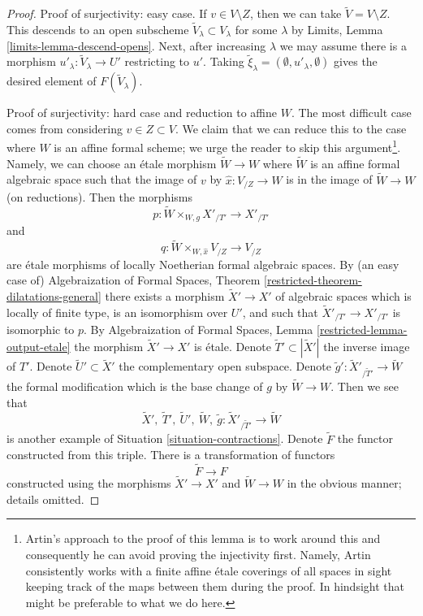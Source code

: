 \begin{proof}
\medskip\noindent
Proof of surjectivity: easy case.
If $v \in V \setminus Z$, then we can take $\tilde V = V \setminus Z$.
This descends to an open subscheme $\tilde V_\lambda \subset V_\lambda$
for some $\lambda$ by Limits, Lemma
\ref{limits-lemma-descend-opens}.
Next, after increasing $\lambda$ we may assume
there is a morphism $u'_\lambda : \tilde V_\lambda \to U'$
restricting to $u'$. Taking
$\tilde \xi_\lambda = (\emptyset, u'_\lambda, \emptyset)$
gives the desired element of $F(\tilde V_\lambda)$.

\medskip\noindent
Proof of surjectivity: hard case and reduction to affine $W$.
The most difficult case comes from considering $v \in Z \subset V$.
We claim that we can reduce this to the case where $W$ is an
affine formal scheme; we urge the reader to skip this argument\footnote{Artin's
approach to the proof of this lemma is to work around this and
consequently he can avoid proving the injectivity first. Namely, Artin
consistently works with a finite affine \'etale coverings of all spaces
in sight keeping track of the maps between them during the proof.
In hindsight that might be preferable to what we do here.}.
Namely, we can choose an \'etale morphism
$\tilde W \to W$ where $\tilde W$ is an affine formal algebraic space
such that the image of $v$ by $\hat x : V_{/Z} \to W$ is
in the image of $\tilde W \to W$ (on reductions).
Then the morphisms
$$
p : \tilde W \times_{W, g} X'_{/T'} \longrightarrow X'_{/T'}
$$
and
$$
q : \tilde W \times_{W, \hat x} V_{/Z} \to V_{/Z}
$$
are \'etale morphisms of locally Noetherian formal algebraic spaces.
By (an easy case of) Algebraization of Formal Spaces, Theorem
\ref{restricted-theorem-dilatations-general}
there exists a morphism $\tilde X' \to X'$ of algebraic spaces
which is locally of finite type, is an isomorphism over $U'$, and
such that $\tilde X'_{/T'} \to X'_{/T'}$ is isomorphic to $p$.
By Algebraization of Formal Spaces, Lemma \ref{restricted-lemma-output-etale}
the morphism $\tilde X' \to X'$ is \'etale. Denote
$\tilde T' \subset |\tilde X'|$ the inverse image of $T'$.
Denote $\tilde U' \subset \tilde X'$ the complementary open subspace.
Denote $\tilde g' : \tilde X'_{/\tilde T'} \to \tilde W$
the formal modification which is the base change of $g$ by
$\tilde W \to W$. Then we see that
$$
\tilde X',\ \tilde T',\ \tilde U',\ \tilde W,
\ \tilde g : \tilde X'_{/\tilde T'} \to \tilde W
$$
is another example of Situation \ref{situation-contractions}.
Denote $\tilde F$ the functor constructed from this triple.
There is a transformation of functors
$$
\tilde F \longrightarrow F
$$
constructed using the morphisms $\tilde X' \to X'$ and
$\tilde W \to W$ in the obvious manner; details omitted.


\end{proof}
